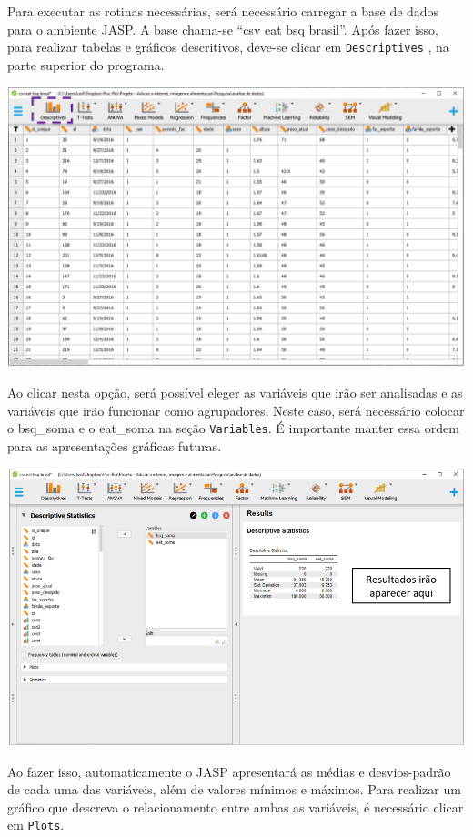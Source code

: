 \documentclass[
]{book}
\begin{document}
Para executar as rotinas necessárias, será necessário carregar a base de dados para o ambiente JASP. A base chama-se ``csv eat bsq brasil''. Após fazer isso, para realizar tabelas e gráficos descritivos, deve-se clicar em \texttt{Descriptives} , na parte superior do programa.

\includegraphics{./img/cap_correlacao_descritivo.png}

Ao clicar nesta opção, será possível eleger as variáveis que irão ser analisadas e as variáveis que irão funcionar como agrupadores. Neste caso, será necessário colocar o bsq\_soma e o eat\_soma na seção \texttt{Variables}. É importante manter essa ordem para as apresentações gráficas futuras.

\includegraphics{./img/cap_reg_descritivo.png}

Ao fazer isso, automaticamente o JASP apresentará as médias e desvios-padrão de cada uma das variáveis, além de valores mínimos e máximos. Para realizar um gráfico que descreva o relacionamento entre ambas as variáveis, é necessário clicar em \texttt{Plots}.
\end{document}
